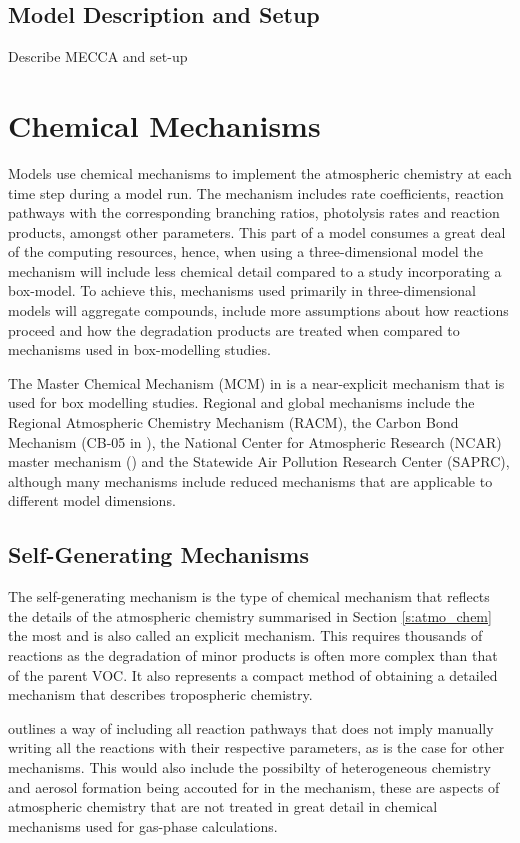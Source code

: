 \subsection{Model Description and Setup}
Describe MECCA and set-up

\section{Chemical Mechanisms}
Models use chemical mechanisms to implement the atmospheric chemistry at each time step during a model run. 
The mechanism includes rate coefficients, reaction pathways with the corresponding branching ratios, photolysis rates and reaction products, amongst other parameters. 
This part of a model consumes a great deal of the computing resources, hence, when using a three-dimensional model the mechanism will include less chemical detail compared to a study incorporating a box-model. 
To achieve this, mechanisms used primarily in three-dimensional models will aggregate compounds, include more assumptions about how reactions proceed and how the degradation products are treated when compared to mechanisms used in box-modelling studies.

The Master Chemical Mechanism (MCM) in \citep{Saunders:2003, Jenkin:2003} is a near-explicit mechanism that is used for box modelling studies. 
Regional and global mechanisms include the Regional Atmospheric Chemistry Mechanism (RACM), the Carbon Bond Mechanism (CB-05 in \citep{Yarwood:2005}), the National Center for Atmospheric Research (NCAR) master mechanism (\citep{Madronich:1989}) and the Statewide Air Pollution Research Center (SAPRC), although many mechanisms include reduced mechanisms that are applicable to different model dimensions. 

\subsection{Self-Generating Mechanisms}
The self-generating mechanism is the type of chemical mechanism that reflects the details of the atmospheric chemistry summarised in Section \ref{s:atmo_chem} the most and is also called an explicit mechanism. 
This requires thousands of reactions as the degradation of minor products is often more complex than that of the parent VOC. 
It also represents a compact method of obtaining a detailed mechanism that describes tropospheric chemistry.

\citep{Aumont:2005} outlines a way of including all reaction pathways that does not imply manually writing all the reactions with their respective parameters, as is the case for other mechanisms. 
This would also include the possibilty of heterogeneous chemistry and aerosol formation being accouted for in the mechanism, these are aspects of atmospheric chemistry that are not treated in great detail in chemical mechanisms used for gas-phase calculations.

